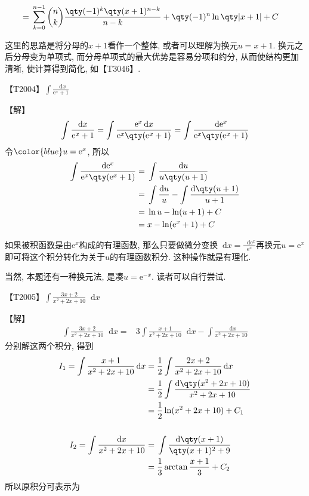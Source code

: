 \documentclass{ctexbook}
\newcommand{\e}{\mathrm{e}}
\newcommand*{\dif}{\mathop{}\!\mathrm{d}}
\begin{document}
{\begin{align*}
={}&\sum_{k=0}^{n-1}\binom{n}{k}\frac{\qty(-1)^{k}\qty(x+1)^{n-k}}{n-k}+\qty(-1)^{n}\ln\qty|x+1|+C
\end{align*}\par
{\kaishu 这里的思路是将分母的$x+1$看作一个整体, 或者可以理解为换元$u=x+1$. 换元之后分母变为单项式, 而分母单项式的最大优势是容易分项和约分, 从而使结构更加清晰, 使计算得到简化, 如【T3046】. \par}
{\color{red}【T2004】}$\int\frac{\dif{x}}{\e^{x}+1}$\par
【解】
\begin{align*}
\int\frac{\dif{x}}{\e^{x}+1}=\int\frac{\e^{x}\dif{x}}{\e^{x}\qty(\e^{x}+1)}=\int\frac{\dif{\e^{x}}}{\e^{x}\qty(\e^{x}+1)}
\end{align*}
令$\color{blue}u=\e^{x}$, 所以
\begin{align*}
\int\frac{\dif{\e^{x}}}{\e^{x}\qty(\e^{x}+1)}={}&\int\frac{\dif{u}}{u\qty(u+1)}\\
={}&\int\frac{\dif{u}}{u}-\int\frac{\dif{\qty(u+1)}}{u+1}\\
={}&\ln{u}-\ln(u+1)+C\\
={}&x-\ln(\e^{x}+1)+C
\end{align*}\par
{\kaishu 如果被积函数是由$\e^{x}$构成的有理函数, 那么只要做微分变换$\dif{x}=\frac{\dif{\e^{x}}}{\e^{x}}$再换元$u=\e^{x}$即可将这个积分转化为关于$u$的有理函数积分. 这种操作就是有理化. \par
当然, 本题还有一种换元法, 是凑$u=\e^{-x}$. 读者可以自行尝试. \par}
{\color{red}【T2005】}$\int\frac{3x+2}{x^{2}+2x+10}\dif{x}$\par
【解】
\begin{align*}
\int\frac{3x+2}{x^{2}+2x+10}\dif{x}={}&3\int\frac{x+1}{x^{2}+2x+10}\dif{x}-\int\frac{\dif{x}}{x^{2}+2x+10}
\end{align*}
分别解这两个积分, 得到
\begin{align*}
I_{1}=\int\frac{x+1}{x^{2}+2x+10}\dif{x}={}&\frac{1}{2}\int\frac{2x+2}{x^{2}+2x+10}\dif{x}\\
={}&\frac{1}{2}\int\frac{\dif{\qty(x^{2}+2x+10)}}{x^{2}+2x+10}\\
={}&\frac{1}{2}\ln(x^{2}+2x+10)+C_{1}\\
\\
I_{2}=\int\frac{\dif{x}}{x^{2}+2x+10}={}&\int\frac{\dif{\qty(x+1)}}{\qty(x+1)^{2}+9}\\
={}&\frac{1}{3}\arctan{\frac{x+1}{3}}+C_{2}
\end{align*}
所以原积分可表示为
\begin{align*}

\end{align*}}
\end{document}

